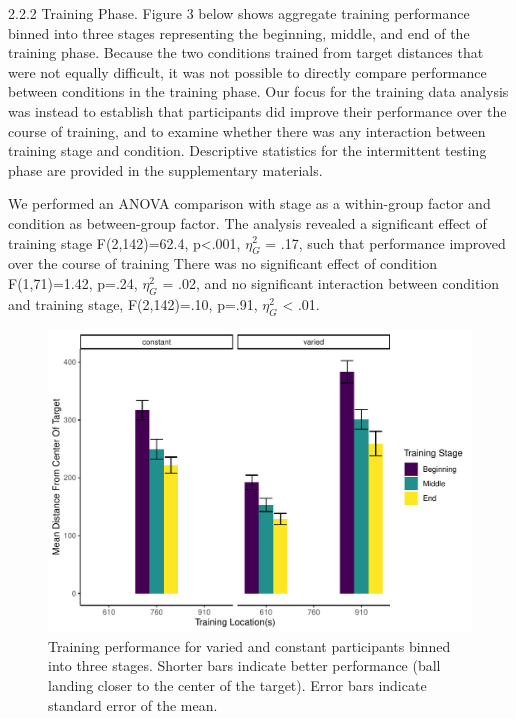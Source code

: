 \documentclass[
  man,floatsintext]{apa7}
\begin{document}
2.2.2 Training Phase. Figure 3 below shows aggregate training performance binned into three stages representing the beginning, middle, and end of the training phase. Because the two conditions trained from target distances that were not equally difficult, it was not possible to directly compare performance between conditions in the training phase. Our focus for the training data analysis was instead to establish that participants did improve their performance over the course of training, and to examine whether there was any interaction between training stage and condition. Descriptive statistics for the intermittent testing phase are provided in the supplementary materials.

We performed an ANOVA comparison with stage as a within-group factor and condition as between-group factor. The analysis revealed a significant effect of training stage F(2,142)=62.4, p\textless.001, \(\eta^{2}_G\) = .17, such that performance improved over the course of training There was no significant effect of condition F(1,71)=1.42, p=.24, \(\eta^{2}_G\) = .02, and no significant interaction between condition and training stage, F(2,142)=.10, p=.91, \(\eta^{2}_G\) \textless{} .01.



\begin{figure}
\centering
\includegraphics{IGAS_PJ_files/figure-latex/Training-1.pdf}
\caption{\label{fig:Training}Training performance for varied and constant participants binned into three stages. Shorter bars indicate better performance (ball landing closer to the center of the target). Error bars indicate standard error of the mean.}
\end{figure}
\end{document}
